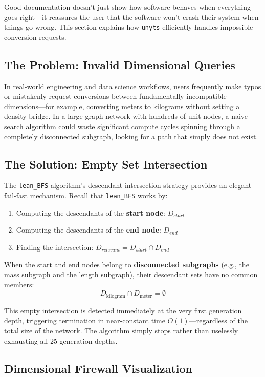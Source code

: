 \documentclass[11pt,a4paper]{report}
\begin{document}
Good documentation doesn't just show how software behaves when everything goes right---it reassures the user that the software won't crash their system when things go wrong. This section explains how \texttt{unyts} efficiently handles impossible conversion requests.

\subsection{The Problem: Invalid Dimensional Queries}

In real-world engineering and data science workflows, users frequently make typos or mistakenly request conversions between fundamentally incompatible dimensions---for example, converting meters to kilograms without setting a density bridge. In a large graph network with hundreds of unit nodes, a naive search algorithm could waste significant compute cycles spinning through a completely disconnected subgraph, looking for a path that simply does not exist.

\subsection{The Solution: Empty Set Intersection}

The \texttt{lean\_BFS} algorithm's descendant intersection strategy provides an elegant fail-fast mechanism. Recall that \texttt{lean\_BFS} works by:
\begin{enumerate}[leftmargin=*]
  \item Computing the descendants of the \textbf{start node}: $D_{start}$
  \item Computing the descendants of the \textbf{end node}: $D_{end}$
  \item Finding the intersection: $D_{relevant} = D_{start} \cap D_{end}$
\end{enumerate}

When the start and end nodes belong to \textbf{disconnected subgraphs} (e.g., the mass subgraph and the length subgraph), their descendant sets have no common members:
\[
D_{\text{kilogram}} \cap D_{\text{meter}} = \emptyset
\]

This empty intersection is detected immediately at the very first generation depth, triggering termination in near-constant time $O(1)$---regardless of the total size of the network. The algorithm simply stops rather than uselessly exhausting all 25 generation depths.

\subsection{Dimensional Firewall Visualization}
\end{document}
